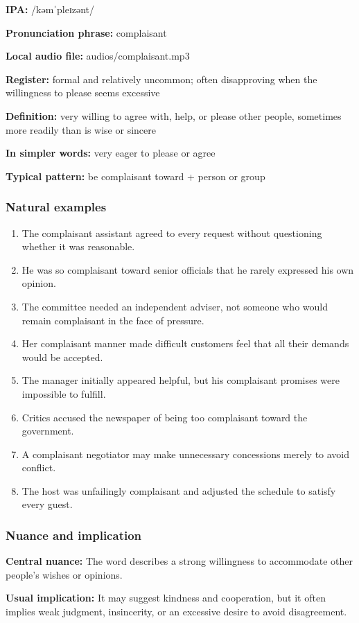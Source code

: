 \documentclass[11pt]{article}
\begin{document}
\textbf{IPA:} /kəmˈpleɪzənt/

\textbf{Pronunciation phrase:} complaisant

\textbf{Local audio file:} audios/complaisant.mp3

\textbf{Register:} formal and relatively uncommon; often disapproving when the willingness to please seems excessive

\textbf{Definition:} very willing to agree with, help, or please other people, sometimes more readily than is wise or sincere

\textbf{In simpler words:} very eager to please or agree

\textbf{Typical pattern:} be complaisant toward + person or group

\subsubsection{Natural examples}
\begin{enumerate}
  \item The complaisant assistant agreed to every request without questioning whether it was reasonable.
  \item He was so complaisant toward senior officials that he rarely expressed his own opinion.
  \item The committee needed an independent adviser, not someone who would remain complaisant in the face of pressure.
  \item Her complaisant manner made difficult customers feel that all their demands would be accepted.
  \item The manager initially appeared helpful, but his complaisant promises were impossible to fulfill.
  \item Critics accused the newspaper of being too complaisant toward the government.
  \item A complaisant negotiator may make unnecessary concessions merely to avoid conflict.
  \item The host was unfailingly complaisant and adjusted the schedule to satisfy every guest.
\end{enumerate}

\subsubsection{Nuance and implication}
\textbf{Central nuance:} The word describes a strong willingness to accommodate other people's wishes or opinions.

\textbf{Usual implication:} It may suggest kindness and cooperation, but it often implies weak judgment, insincerity, or an excessive desire to avoid disagreement.
\end{document}
